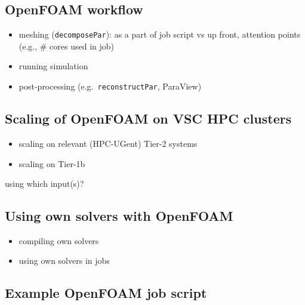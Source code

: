 \subsection{OpenFOAM workflow}

\begin{itemize}
\item meshing (\texttt{decomposePar}): as a part of job script vs up front, attention points (e.g., \# cores used in job)
\item running simulation
\item post-processing (e.g.\ \texttt{reconstructPar}, ParaView)
\end{itemize}

\subsection{Scaling of OpenFOAM on VSC HPC clusters}

\begin{itemize}
\item scaling on relevant (HPC-UGent) Tier-2 systems
\item scaling on Tier-1b
\end{itemize}

using which input(s)?

\subsection{Using own solvers with OpenFOAM}

\begin{itemize}
\item compiling own solvers
\item using own solvers in jobs
\end{itemize}

\subsection{Example OpenFOAM job script}


